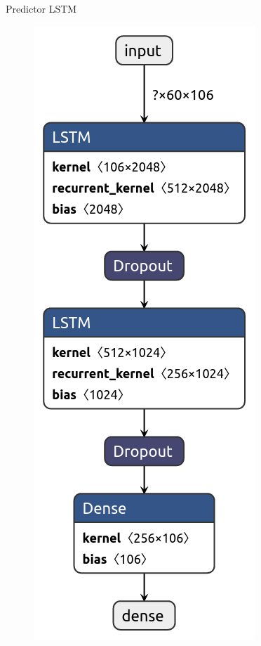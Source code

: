 \documentclass[10pt]{beamer}
\begin{document}
\begin{frame}[fragile]{Predictor LSTM}
	\vspace{10px}
	\pause
	
	\begin{figure}[H]
		\centering
		\includegraphics[scale=0.23]{Imagenes/lstm-forecaster.png}
	\end{figure}
	
\end{frame}
\end{document}
